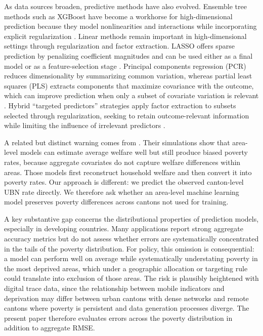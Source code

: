 \documentclass[pdflatex,sn-apa]{sn-jnl}
\begin{document}
As data sources broaden, predictive methods have also evolved. Ensemble tree methods such as XGBoost have become a workhorse for high-dimensional prediction because they model nonlinearities and interactions while incorporating explicit regularization \citep{chen2016xgboost}. Linear methods remain important in high-dimensional settings through regularization and factor extraction. LASSO offers sparse prediction by penalizing coefficient magnitudes and can be used either as a final model or as a feature-selection stage \citep{Tibshirani1996}. Principal components regression (PCR) reduces dimensionality by summarizing common variation, whereas partial least squares (PLS) extracts components that maximize covariance with the outcome, which can improve prediction when only a subset of covariate variation is relevant \citep{Hastie2009, WOLD1973}. Hybrid ``targeted predictors'' strategies apply factor extraction to subsets selected through regularization, seeking to retain outcome-relevant information while limiting the influence of irrelevant predictors \citep{bai2008forecasting, Bair2006}.

A related but distinct warning comes from \citet{CorralRodas2025Aggregation}. Their simulations show that area-level models can estimate average welfare well but still produce biased poverty rates, because aggregate covariates do not capture welfare differences within areas. Those models first reconstruct household welfare and then convert it into poverty rates. Our approach is different: we predict the observed canton-level UBN rate directly. We therefore ask whether an area-level machine learning model preserves poverty differences across cantons not used for training.

A key substantive gap concerns the distributional properties of prediction models, especially in developing countries. Many applications report strong aggregate accuracy metrics but do not assess whether errors are systematically concentrated in the tails of the poverty distribution. For policy, this omission is consequential: a model can perform well on average while systematically understating poverty in the most deprived areas, which under a geographic allocation or targeting rule could translate into exclusion of those areas. The risk is plausibly heightened with digital trace data, since the relationship between mobile indicators and deprivation may differ between urban cantons with dense networks and remote cantons where poverty is persistent and data generation processes diverge. The present paper therefore evaluates errors across the poverty distribution in addition to aggregate RMSE.
\end{document}
